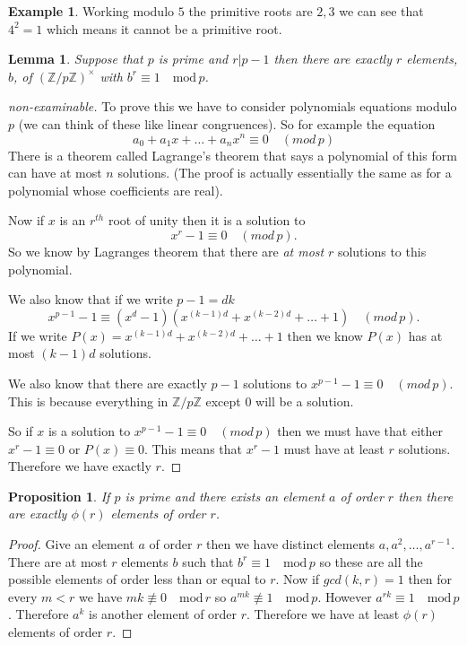 \documentclass[
]{book}
\newtheorem{lemma}{Lemma}[chapter]
\newtheorem{proposition}{Proposition}[chapter]
\theoremstyle{definition}
\theoremstyle{definition}
\newtheorem{example}{Example}[chapter]
\theoremstyle{definition}
\theoremstyle{definition}
\theoremstyle{remark}
\begin{document}
\begin{example}
Working modulo \(5\) the primitive roots are \(2,3\) we can see that \(4^2 = 1\) which means it cannot be a primitive root.
\end{example}

\begin{lemma}
Suppose that \(p\) is prime and \(r|p-1\) then there are exactly \(r\) elements, \(b\), of \(\left(\mathbb{Z}/p\mathbb{Z} \right)^{\times}\) with \(b^r \equiv 1 \quad \mbox{mod}\, p\).
\end{lemma}

\begin{proof}[non-examinable]
To prove this we have to consider polynomials equations modulo \(p\) (we can think of these like linear congruences). So for example the equation
\[ a_0 + a_1 x + \dots + a_n x^n \equiv 0 \quad (mod \, p)\]
There is a theorem called Lagrange's theorem that says a polynomial of this form can have at most \(n\) solutions. (The proof is actually essentially the same as for a polynomial whose coefficients are real).

Now if \(x\) is an \(r^{th}\) root of unity then it is a solution to \[ x^r-1 \equiv 0 \quad (mod \, p).\] So we know by Lagranges theorem that there are \emph{at most} \(r\) solutions to this polynomial.

We also know that if we write \(p-1=dk\)
\[  x^{p-1} -1 \equiv (x^{d}-1)(x^{(k-1)d} + x^{(k-2)d} + \dots + 1) \quad (mod \, p).\]
If we write \(P(x) = x^{(k-1)d} + x^{(k-2)d} + \dots + 1\) then we know \(P(x)\) has at most \((k-1)d\) solutions.

We also know that there are exactly \(p-1\) solutions to \(x^{p-1}-1 \equiv 0 \quad (mod\, p)\). This is because everything in \(\mathbb{Z}/p\mathbb{Z}\) except 0 will be a solution.

So if \(x\) is a solution to \(x^{p-1} -1 \equiv 0 \quad (mod\, p)\) then we must have that either \(x^r-1 \equiv 0\) or \(P(x) \equiv 0\). This means that \(x^r -1\) must have at least \(r\) solutions. Therefore we have exactly \(r\).
\end{proof}

\begin{proposition}
If \(p\) is prime and there exists an element \(a\) of order \(r\) then there are exactly \(\phi(r)\) elements of order \(r\).
\end{proposition}

\begin{proof}
Give an element \(a\) of order \(r\) then we have distinct elements \(a, a^2, \dots, a^{r-1}\). There are at most \(r\) elements \(b\) such that \(b^r \equiv 1 \quad \mbox{mod}\, p\) so these are all the possible elements of order less than or equal to \(r\). Now if \(gcd(k,r) = 1\) then for every \(m < r\) we have \(mk \not\equiv 0 \quad \mbox{mod} \, r\) so \(a^{mk} \not\equiv 1 \quad \mbox{mod} \, p\). However \(a^{rk} \equiv 1 \quad \mbox{mod} \, p\). Therefore \(a^k\) is another element of order \(r\). Therefore we have at least \(\phi(r)\) elements of order \(r\).
\end{proof}
\end{document}
